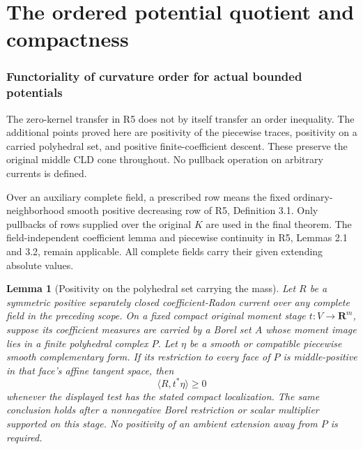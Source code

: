 \documentclass[11pt,a4paper]{article}
\numberwithin{equation}{section}
\newtheorem{lemma}[theorem]{Lemma}
\theoremstyle{definition}
\theoremstyle{remark}
\begin{document}


\part{The ordered potential quotient and compactness}

\section{Functoriality of curvature order for actual bounded potentials}
\label{sec:r6-potential-order-functoriality}

The zero-kernel transfer in R5 does not by itself transfer an order
inequality. The additional points proved here are positivity of the
piecewise traces, positivity on a carried polyhedral set, and positive
finite-coefficient descent. These preserve the original middle CLD
cone throughout. No pullback operation on arbitrary currents is defined.

Over an auxiliary complete field, a prescribed row means the fixed
ordinary-neighborhood smooth positive decreasing row of R5,
Definition 3.1. Only pullbacks of rows supplied over the original
$K$ are used in the final theorem. The field-independent coefficient
lemma and piecewise continuity in R5, Lemmas 2.1 and 3.2, remain
applicable. All complete fields carry their given extending absolute
values.

\begin{lemma}[Positivity on the polyhedral set carrying the mass]
\label{lem:r6-carried-tangent-positivity}
Let $R$ be a symmetric positive separately closed coefficient-Radon
current over any complete field in the preceding scope. On a fixed
compact original moment stage $t:V\to\mathbf R^m$, suppose its
coefficient measures are carried by a Borel set $A$ whose moment
image lies in a finite polyhedral complex $P$. Let $\eta$ be a
smooth or compatible piecewise smooth complementary form. If its
restriction to every face of $P$ is middle-positive in that face's
affine tangent space, then
\[
                         \langle R,t^*\eta\rangle\geq0
\]
whenever the displayed test has the stated compact localization.
The same conclusion holds after a nonnegative Borel restriction
or scalar multiplier supported on this stage. No positivity of an
ambient extension away from $P$ is required.
\end{lemma}
\end{document}
